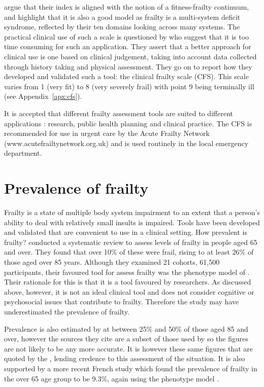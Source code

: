 \documentclass
[
	12pt,
	a4paper,
	oneside,
]{report}
\begin{document}
\textcite{jones:05} argue that their index is aligned with the notion of a 
fitness-frailty continuum, and highlight that it is also a good model as frailty
is a multi-system deficit syndrome, reflected by their ten domains looking
across many systems. The practical clinical use of such a scale is questioned
by \textcite{rockwood:05} who suggest that it is too time consuming for such an
application. They assert that a better approach for clinical use is one based
on clinical judgement, taking into account data collected through history taking
and physical assessment. They go on to report how they developed and validated
such a tool: the clinical frailty scale (CFS). This scale varies from 1 (very fit)
to 8 (very severely frail) with point 9 being terminally ill 
(see Appendix~\ref{apx:cfs}).

It is accepted that different frailty assessment tools are suited to different
applications \parencite{ensrud:08,martin:08,romero-ortuno:16}: research, public
health planning and clinical practice. The CFS is recommended for use in urgent
care by the Acute Frailty Network (www.acutefrailtynetwork.org.uk) and is
used routinely in the local emergency department.

\section{Prevalence of frailty}
\label{sec:litrevprev}

Frailty is a state of multiple body system impairment to an extent that a
person's ability to deal with relatively small insults is impaired. Tools have 
been developed and validated that are convenient to use in a clinical setting.
How prevalent is frailty? \textcite{collard:12} conducted a systematic review 
to assess levels of frailty in people aged 65 and over. They found that over
10\% of these were frail, rising to at least 26\% of those aged over 85 years.
Although they examined 21 cohorts, 61,500 participants, their favoured tool for 
assess frailty was the phenotype model of \textcite{fried:01}. Their rationale
for this is that it is a tool favoured by researchers. As discussed 
above, however, it is not an ideal clinical tool and does not consider cognitive or
psychosocial issues that contribute to frailty. Therefore the study may have 
underestimated the prevalence of frailty.

Prevalence is also estimated by \textcite{clegg:13} at between 25\% and 50\% of
those aged 85 and over, however the sources they cite are a subset of those
used by \textcite{collard:12} so the figures are not likely to be any more
accurate. It is however these same figures that are quoted by the
\textcite{bgs:14}, lending credence to this assessment of the situation. It
is also supported by a more recent French study which found the prevalence of
frailty in the over 65 age group to be 9.3\%, again using the phenotype model
\parencite{cossec:16}.
\end{document}
